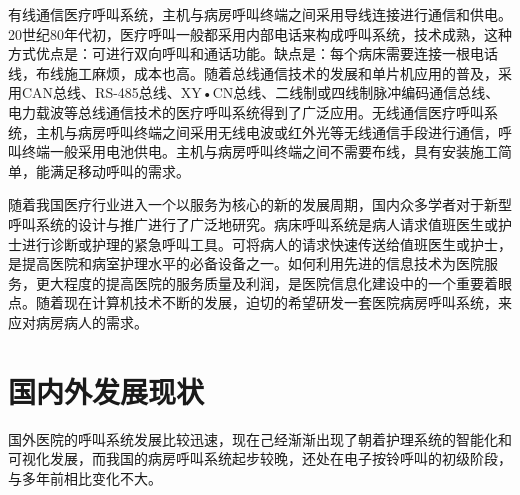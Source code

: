 有{\cf}线通{\cf}信医{\cf}疗呼{\cf}叫系{\cf}统，{\cf}主机{\cf}与病{\cf}房呼{\cf}叫终{\cf}端之{\cf}间采{\cf}用导{\cf}线连{\cf}接进{\cf}行通{\cf}信和{\cf}供电{\cf}。2{\cf}0世{\cf}纪8{\cf}0年{\cf}代初{\cf}，医{\cf}疗呼{\cf}叫一{\cf}般都{\cf}采用{\cf}内部{\cf}电话{\cf}来构{\cf}成呼{\cf}叫系{\cf}统，{\cf}技术{\cf}成熟{\cf}，这{\cf}种方{\cf}式优{\cf}点是{\cf}：可{\cf}进行{\cf}双向{\cf}呼叫{\cf}和通{\cf}话功{\cf}能。{\cf}缺点{\cf}是：{\cf}每个{\cf}病床{\cf}需要{\cf}连接{\cf}一根{\cf}电话{\cf}线，{\cf}布线{\cf}施工{\cf}麻烦{\cf}，成{\cf}本也{\cf}高。{\cf}随着{\cf}总线{\cf}通信{\cf}技术{\cf}的发{\cf}展和{\cf}单片{\cf}机应{\cf}用的{\cf}普及{\cf}，采{\cf}用C{\cf}AN{\cf}总线{\cf}、R{\cf}S-{\cf}48{\cf}5总{\cf}线、{\cf}XY{\cf}•C{\cf}N总{\cf}线、{\cf}二线{\cf}制或{\cf}四线{\cf}制脉{\cf}冲编{\cf}码通{\cf}信总{\cf}线、{\cf}电力{\cf}载波{\cf}等总{\cf}线通{\cf}信技{\cf}术的{\cf}医疗{\cf}呼叫{\cf}系统{\cf}得到{\cf}了广{\cf}泛应{\cf}用。{\cf}无线{\cf}通信{\cf}医疗{\cf}呼叫{\cf}系统{\cf}，主{\cf}机与{\cf}病房{\cf}呼叫{\cf}终端{\cf}之间{\cf}采用{\cf}无线{\cf}电波{\cf}或红{\cf}外光{\cf}等无{\cf}线通{\cf}信手{\cf}段进{\cf}行通{\cf}信，{\cf}呼叫{\cf}终端{\cf}一般{\cf}采用{\cf}电池{\cf}供电{\cf}。主{\cf}机与{\cf}病房{\cf}呼叫{\cf}终端{\cf}之间{\cf}不需{\cf}要布{\cf}线，{\cf}具有{\cf}安装{\cf}施工{\cf}简单{\cf}，能{\cf}满足{\cf}移动{\cf}呼叫{\cf}的需{\cf}求。 

随{\cf}着我{\cf}国医{\cf}疗行{\cf}业进{\cf}入一{\cf}个以{\cf}服务{\cf}为核{\cf}心的{\cf}新的{\cf}发展{\cf}周期{\cf}，国{\cf}内众{\cf}多学{\cf}者对{\cf}于新{\cf}型呼{\cf}叫系{\cf}统的{\cf}设计{\cf}与推{\cf}广进{\cf}行了{\cf}广泛{\cf}地研{\cf}究。{\cf}病床{\cf}呼叫{\cf}系统{\cf}是病{\cf}人请{\cf}求值{\cf}班医{\cf}生或{\cf}护士{\cf}进行{\cf}诊断{\cf}或护{\cf}理的{\cf}紧急{\cf}呼叫{\cf}工具{\cf}。可{\cf}将病{\cf}人的{\cf}请求{\cf}快速{\cf}传送{\cf}给值{\cf}班医{\cf}生或{\cf}护士{\cf}，是{\cf}提高{\cf}医院{\cf}和病{\cf}室护{\cf}理水{\cf}平的{\cf}必备{\cf}设备{\cf}之一{\cf}。如{\cf}何利{\cf}用先{\cf}进的{\cf}信息{\cf}技术{\cf}为医{\cf}院服{\cf}务，{\cf}更大{\cf}程度{\cf}的提{\cf}高医{\cf}院的{\cf}服务{\cf}质量{\cf}及利{\cf}润，{\cf}是医{\cf}院信{\cf}息化{\cf}建设{\cf}中的{\cf}一个{\cf}重要{\cf}着眼{\cf}点。{\cf}随着{\cf}现在{\cf}计算{\cf}机技{\cf}术不{\cf}断的{\cf}发展{\cf}，迫{\cf}切的{\cf}希望{\cf}研发{\cf}一套{\cf}医院{\cf}病房{\cf}呼叫{\cf}系统{\cf}，来{\cf}应对{\cf}病房{\cf}病人的需求。

\section{国内外发展现状}
国外医院的呼叫系统发展比较迅速，现在己经渐渐出现了朝着护理系统的智能化和可视化发展，而我国的病房呼叫系统起步较晚，还处在电子按铃呼叫的初级阶段，与多年前相比变化不大。

